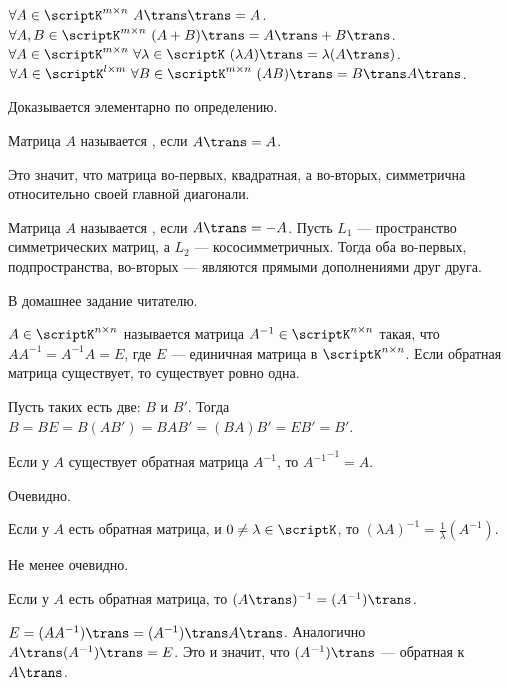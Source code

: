 \documentclass{article}
\begin{document}
\begin{itemize}
        \thm $\forall A\in\scriptK^{m\times n}~{A\trans}\trans=A$.
        \thm $\forall A,B\in\scriptK^{m\times n}~(A+B)\trans=A\trans+B\trans$.
        \thm $\forall A\in\scriptK^{m\times n}~\forall\lambda\in\scriptK~(\lambda A)\trans=\lambda(A\trans)$.
        \thm $\forall A\in\scriptK^{l\times m}~\forall B\in\scriptK^{m\times n}~(AB)\trans=B\trans A\trans$.
        \begin{Proof}
            Доказывается элементарно по определению.
        \end{Proof}
        \dfn Матрица $A$ называется , если $A\trans=A$.
        \begin{Comment}
            Это значит, что матрица во-первых, квадратная, а во-вторых, симметрична относительно своей главной диагонали.
        \end{Comment}
        \dfn Матрица $A$ называется , если $A\trans=-A$.
        \thm Пусть $L_1$ --- пространство симметрических матриц, а $L_2$ --- кососимметричных. Тогда оба во-первых, подпространства, во-вторых --- являются прямыми дополнениями друг друга.
        \begin{Proof}
            В домашнее задание читателю.
        \end{Proof}
        \dfn {} $A\in\scriptK^{n\times n}$ называется матрица $A^{-1}\in\scriptK^{n\times n}$ такая, что $AA^{-1}=A^{-1}A=E$, где $E$ --- единичная матрица в $\scriptK^{n\times n}$.
        \thm Если обратная матрица существует, то существует ровно одна.
        \begin{Proof}
            Пусть таких есть две: $B$ и $B'$. Тогда $B=BE=B(AB')=BAB'=(BA)B'=EB'=B'$.
        \end{Proof}
        \thm Если у $A$ существует обратная матрица $A^{-1}$, то ${A^{-1}}^{-1}=A$.
        \begin{Proof}
            Очевидно.
        \end{Proof}
        \thm Если у $A$ есть обратная матрица, и $0\neq\lambda\in\scriptK$, то $(\lambda A)^{-1}=\frac1\lambda(A^{-1})$.
        \begin{Proof}
            Не менее очевидно.
        \end{Proof}
        \thm Если у $A$ есть обратная матрица, то $(A\trans)^{-1}=(A^{-1})\trans$.
        \begin{Proof}
            $E=(AA^{-1})\trans=(A^{-1})\trans A\trans$. Аналогично $A\trans(A^{-1})\trans=E$. Это и значит, что $(A^{-1})\trans$ --- обратная к $A\trans$.

\end{Proof}
\end{itemize}
\end{document}
